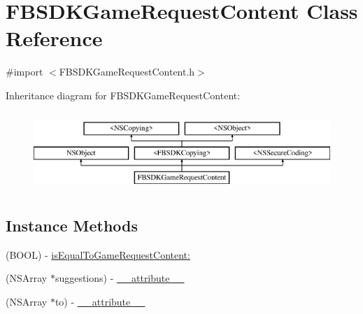 \hypertarget{interface_f_b_s_d_k_game_request_content}{}\section{F\+B\+S\+D\+K\+Game\+Request\+Content Class Reference}
\label{interface_f_b_s_d_k_game_request_content}


{\ttfamily \#import $<$F\+B\+S\+D\+K\+Game\+Request\+Content.\+h$>$}

Inheritance diagram for F\+B\+S\+D\+K\+Game\+Request\+Content\+:\begin{figure}[H]
\begin{center}
\leavevmode
\includegraphics[height=3.000000cm]{interface_f_b_s_d_k_game_request_content}
\end{center}
\end{figure}
\subsection*{Instance Methods}
\begin{DoxyCompactItemize}
\item 
(B\+O\+O\+L) -\/ \hyperlink{interface_f_b_s_d_k_game_request_content_a1f622f3da8f3ff8e395b1d4802c96279}{is\+Equal\+To\+Game\+Request\+Content\+:}
\item 
(N\+S\+Array $\ast$suggestions) -\/ \hyperlink{interface_f_b_s_d_k_game_request_content_ab88f3c5b306c53ef92841438098600e0}{\+\_\+\+\_\+attribute\+\_\+\+\_\+}
\item 
(N\+S\+Array $\ast$to) -\/ \hyperlink{interface_f_b_s_d_k_game_request_content_a6399cfcc9a213e74860d5fdc8c102425}{\+\_\+\+\_\+attribute\+\_\+\+\_\+}
\end{DoxyCompactItemize}
